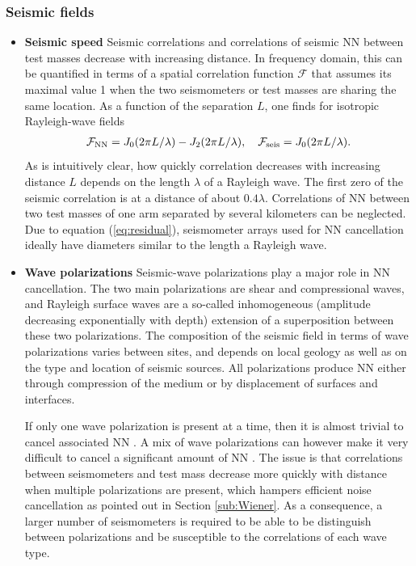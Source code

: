 \subsubsection*{Seismic fields}
\begin{itemize}
\item {\bf Seismic speed}\; Seismic correlations and correlations of seismic NN between test masses decrease with increasing distance. In frequency domain, this can be quantified in terms of a spatial correlation function $\mathcal F$ that assumes its maximal value 1 when the two seismometers or test masses are sharing the same location. As a function of the separation $L$, one finds for isotropic Rayleigh-wave fields
\begin{eqnarray}
	\mathcal{F}_{\rm NN}=J_{0}(2\pi L/\lambda)-J_{2}(2\pi L/\lambda),\quad \mathcal{F}_{\rm seis}=J_{0}(2\pi L/\lambda).
	\label{eq:geometrical}
\end{eqnarray}
As is intuitively clear, how quickly correlation decreases with increasing distance $L$ depends on the length $\lambda$ of a Rayleigh wave. The first zero of the seismic correlation is at a distance of about $0.4\lambda$. Correlations of NN between two test masses of one arm separated by several kilometers can be neglected. Due to equation (\ref{eq:residual}), seismometer arrays used for NN cancellation ideally have diameters similar to the length a Rayleigh wave. 

\item {\bf Wave polarizations}\; Seismic-wave polarizations play a major role in NN cancellation. The two main polarizations are shear and compressional waves, and Rayleigh surface waves are a so-called inhomogeneous (amplitude decreasing exponentially with depth) extension of a superposition between these two polarizations. The composition of the seismic field in terms of wave polarizations varies between sites, and depends on local geology as well as on the type and location of seismic sources. All polarizations produce NN either through compression of the medium or by displacement of surfaces and interfaces.

If only one wave polarization is present at a time, then it is almost trivial to cancel associated NN \cite{Har2015,HaVe2016}. A mix of wave polarizations can however make it very difficult to cancel a significant amount of NN \cite{HaVe2016,BaHa2019}. The issue is that correlations between seismometers and test mass decrease more quickly with distance when multiple polarizations are present, which hampers efficient noise cancellation as pointed out in Section \ref{sub:Wiener}. As a consequence, a larger number of seismometers is required to be able to be distinguish between polarizations and be susceptible to the correlations of each wave type. 


\end{itemize}

